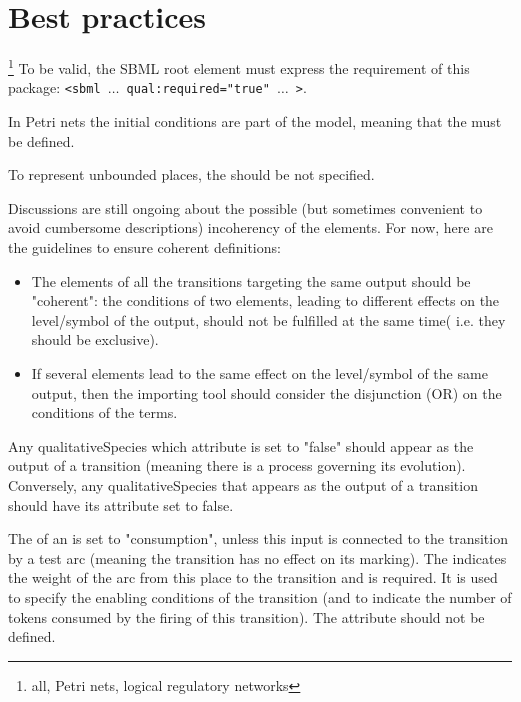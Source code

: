 
\section{Best practices}
\label{best-practices}




\ALL\footnote{\ALL all, \PN Petri nets, \LRG logical regulatory networks} To be valid, the SBML root element must express the requirement of this package: \texttt{<sbml $\dots$ qual:required="true" $\dots$ >}.

\medskip
\PN In Petri nets the initial conditions are part of the model, meaning that the  must be defined.

\medskip
\PN To represent unbounded places, the  should be not specified.

\medskip
\LRG Discussions are still ongoing about the possible (but sometimes convenient to avoid cumbersome descriptions) incoherency of the  elements. For now, here are the guidelines to ensure coherent definitions:
\begin{itemize}
\item The  elements of all the transitions targeting the same output should be "coherent": the conditions of two  elements, leading to different effects on the level/symbol of the output, should not be fulfilled at the same time( i.e. they should be exclusive).
\item If several  elements lead to the same effect on the level/symbol of the same output, then the importing tool should consider the disjunction (OR) on the conditions of the terms. 
\end{itemize}
\medskip

\LRG Any qualitativeSpecies which attribute  is set to "false" should appear as the output of a transition (meaning there is a process governing its evolution). Conversely, any qualitativeSpecies that appears as the output of a transition should have its attribute  set to false.

\medskip
\PN  The  of an  is set to "consumption", unless this input is connected to the transition by a test arc (meaning the transition has no effect on its marking). The  indicates the weight of the arc from this place to the transition and is required. It is used to specify the enabling conditions of the transition (and to indicate the number of tokens consumed by the firing of this transition). The  attribute should not be defined.

